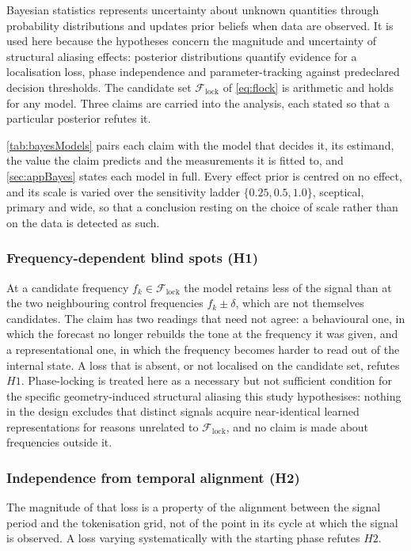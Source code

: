 Bayesian statistics represents uncertainty about unknown quantities through probability distributions and updates prior beliefs when data are observed\autocite{murphyProbabilisticMachineLearning2023}. It is used here because the hypotheses concern the magnitude and uncertainty of structural aliasing effects: posterior distributions quantify evidence for a localisation loss, phase independence and parameter-tracking against predeclared decision thresholds. The candidate set $\mathcal F_{\mathrm{lock}}$ of \autoref{eq:flock} is arithmetic and holds for any model. Three claims are carried into the analysis, each stated so that a particular posterior refutes it.

\autoref{tab:bayesModels} pairs each claim with the model that decides it, its estimand, the value the claim predicts and the measurements it is fitted to, and \autoref{sec:appBayes} states each model in full. Every effect prior is centred on no effect, and its scale is varied over the sensitivity ladder $\{0.25,0.5,1.0\}$, sceptical, primary and wide, so that a conclusion resting on the choice of scale rather than on the data is detected as such.

\subsubsection*{Frequency-dependent blind spots (H1)}
At a candidate frequency $f_k\in\mathcal F_{\mathrm{lock}}$ the model retains less of the signal than at the two neighbouring control frequencies $f_k\pm\delta$, which are not themselves candidates. The claim has two readings that need not agree: a behavioural one, in which the forecast no longer rebuilds the tone at the frequency it was given, and a representational one, in which the frequency becomes harder to read out of the internal state. A loss that is absent, or not localised on the candidate set, refutes $H1$. Phase-locking is treated here as a necessary but not sufficient condition for the specific geometry-induced structural aliasing this study hypothesises: nothing in the design excludes that distinct signals acquire near-identical learned representations for reasons unrelated to $\mathcal F_{\mathrm{lock}}$, and no claim is made about frequencies outside it.

\subsubsection*{Independence from temporal alignment (H2)}
The magnitude of that loss is a property of the alignment between the signal period and the tokenisation grid, not of the point in its cycle at which the signal is observed. A loss varying systematically with the starting phase refutes $H2$.


